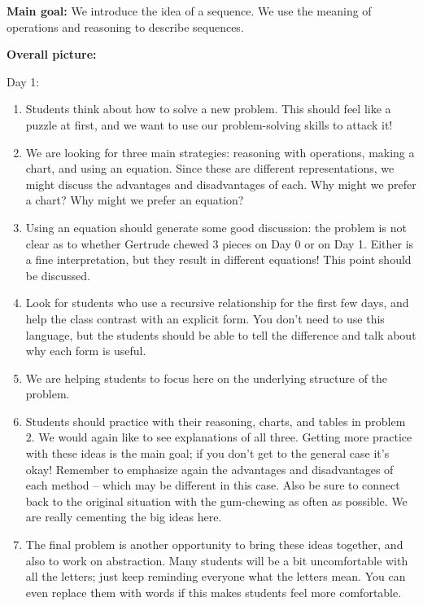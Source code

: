 \documentclass{ximera}
\begin{document}
\begin{instructorNotes}
{\bf Main goal:} We introduce the idea of a sequence. We use the meaning of operations and reasoning to describe sequences.


{\bf Overall picture:}

Day 1:
\begin{enumerate}
\item Students think about how to solve a new problem. This should feel like a puzzle at first, and we want to use our problem-solving skills to attack it!
\item We are looking for three main strategies: reasoning with operations, making a chart, and using an equation. Since these are different representations, we might discuss the advantages and disadvantages of each. Why might we prefer a chart? Why might we prefer an equation?
\item Using an equation should generate some good discussion: the problem is not clear as to whether Gertrude chewed 3 pieces on Day 0 or on Day 1. Either is a fine interpretation, but they result in different equations! This point should be discussed.
\item Look for students who use a recursive relationship for the first few days, and help the class contrast with an explicit form. You don't need to use this language, but the students should be able to tell the difference and talk about why each form is useful.

\item We are helping students to focus here on the underlying structure of the problem.

	\item Students should practice with their reasoning, charts, and tables in problem 2. We would again like to see explanations of all three. Getting more practice with these ideas is the main goal; if you don't get to the general case it's okay! Remember to emphasize again the advantages and disadvantages of each method -- which may be different in this case. Also be sure to connect back to the original situation with the gum-chewing as often as possible. We are really cementing the big ideas here.
	\item The final problem is another opportunity to bring these ideas together, and also to work on abstraction. Many students will be a bit uncomfortable with all the letters; just keep reminding everyone what the letters mean. You can even replace them with words if this makes students feel more comfortable.
\end{enumerate}



\end{instructorNotes}
\end{document}
